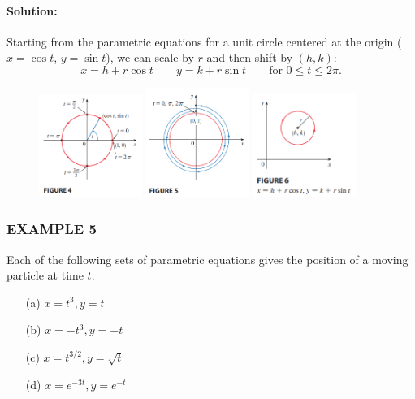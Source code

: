 \documentclass{article}
\begin{document}
\paragraph{Solution:} Starting from the parametric equations for a unit circle centered at the origin ($x=\cos t$, $y=\sin t$), we can scale by $r$ and then shift by $(h,k)$:
\[
x = h + r\cos t \qquad y = k + r\sin t \qquad \text{for } 0 \le t \le 2\pi.
\]
\begin{figure}[htbp]
    \centering
    \includegraphics[width=0.3\textwidth]{graph19.png}
    \includegraphics[width=0.3\textwidth]{graph20.png}
    \includegraphics[width=0.3\textwidth]{graph21.png}
\end{figure}

\subsubsection*{EXAMPLE 5}
Each of the following sets of parametric equations gives the position of a moving particle at time $t$.
\begin{enumerate}
    \item[(a)] $x=t^3, y=t$
    \item[(b)] $x=-t^3, y=-t$
    \item[(c)] $x=t^{3/2}, y=\sqrt{t}$
    \item[(d)] $x=e^{-3t}, y=e^{-t}$
\end{enumerate}
\end{document}
